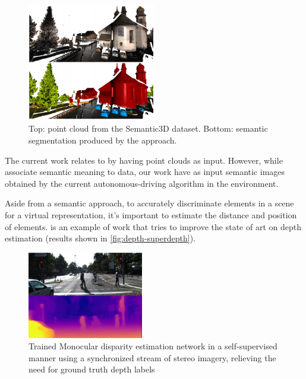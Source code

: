     \begin{figure}[H]
     \caption{\label{fig:semantic-tangent-cnn}
Top: point cloud from the Semantic3D dataset. Bottom: semantic segmentation produced by the approach.}
     \begin{center}
        \includegraphics[width=0.5\textwidth]{images/depth_convul.png}
     \end{center}
    \end{figure}
    
    The current work relates to \cite{semantic_article} by having point clouds as input. However, while \cite{semantic_article} associate semantic meaning to data, our work have as input semantic images obtained by the current autonomous-driving algorithm in the environment.
    
    Aside from a semantic approach, to accurately discriminate elements in a scene for a virtual representation, it's important to estimate the distance and position of elements. \cite{toyota-depth} is an example of work that tries to improve the state of art on depth estimation (results shown in \autoref{fig:depth-superdepth}).

    \begin{figure}[H]
     \caption{\label{fig:depth-superdepth}Trained Monocular
disparity estimation network in a self-supervised manner
using a synchronized stream of stereo imagery, relieving
the need for ground truth depth labels}
     \begin{center}
        \includegraphics[width=0.45\textwidth]{images/superdepth-toyota.PNG}
     \end{center}
    \end{figure}

